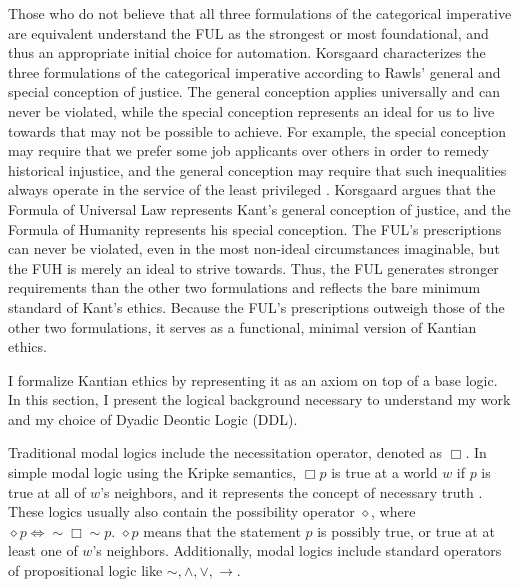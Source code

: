 \begin{isabellebody}
\begin{isamarkuptext}
Those who do not believe that all three formulations of the categorical imperative are equivalent
understand the FUL as the strongest or most foundational, and thus an appropriate initial choice for 
automation. Korsgaard characterizes the three formulations of the categorical
imperative according to Rawls' general and special conception of justice. The general conception applies
universally and can never be violated, while the special conception represents an ideal for us to
live towards that may not be possible to achieve. For example, the special conception may require that we prefer some job applicants
over others in order to remedy historical injustice, and the general conception may require that such
inequalities always operate in the service of the least privileged \citep[19]{KorsgaardRTL}. Korsgaard
argues that the Formula of Universal Law represents Kant's general conception of justice, and the Formula of 
Humanity represents his special conception. The FUL's prescriptions can never be violated, even in the most
non-ideal circumstances imaginable, but the FUH is merely an ideal to strive towards. Thus, the FUL 
generates stronger requirements than the other two formulations and reflects 
the bare minimum standard of Kant's ethics. Because the FUL's prescriptions outweigh those of the other two formulations,
it serves as a functional, minimal version of Kantian ethics.%
\end{isamarkuptext}\isamarkuptrue%
%
\isadelimdocument
%
\endisadelimdocument
%
\isatagdocument
%
\isamarkuptrue%
%
\endisatagdocument
{\isafolddocument}%
%
\isadelimdocument
%
\endisadelimdocument
%
\begin{isamarkuptext}%
I formalize Kantian ethics by representing it as an axiom on top of a base logic. In this section, 
I present the logical background necessary to understand my work and my choice of Dyadic Deontic Logic (DDL).

Traditional modal logics include the necessitation operator, denoted as $\Box$. In simple modal logic
using the Kripke semantics, $\Box p$ is true at a world $w$ if $p$ is true at all of $w$'s neighbors, 
and it represents the concept of necessary truth \citep{cresswell}. 
These logics usually also contain the possibility operator $\diamond$, where
 $\diamond p \iff \sim \Box \sim p$. $\diamond p$ means that the statement $p$ is possibly true, or true
at at least one of $w$'s neighbors. 
Additionally, modal logics include standard operators of propositional logic like $\sim, \wedge, \vee, \rightarrow$.


\end{isamarkuptext}
\end{isabellebody}
